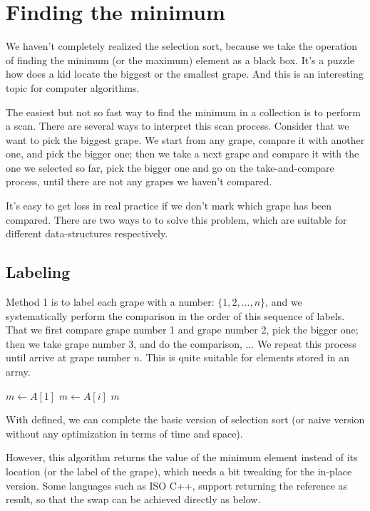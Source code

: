 \documentclass{article}
\begin{document}
\section{Finding the minimum}

We haven't completely realized the selection sort, because we take the operation
of finding the minimum (or the maximum) element as a black box. It's a puzzle how does
a kid locate the biggest or the smallest grape.
And this is an interesting topic for computer algorithms.

The easiest but not so fast way to find the minimum in a collection is to perform
a scan. There are several ways to interpret this scan process. Consider that
we want to pick the biggest grape. We start from any grape, compare it with
another one, and pick the bigger one; then we take a next grape and compare
it with the one we selected so far, pick the bigger one and go on the take-and-compare
process, until there are not any grapes we haven't compared.

It's easy to get loss in real practice if we don't mark which grape has been
compared. There are two ways to to solve this problem, which are suitable for
different data-structures respectively.

\subsection{Labeling}
Method 1 is to label each grape with a number: $\{1, 2, ..., n\}$, and we systematically
perform the comparison in the order of this sequence of labels. That we first
compare grape number 1 and grape number 2, pick the bigger one; then we take grape
number 3, and do the comparison, ... We repeat this process until arrive at
grape number $n$. This is quite suitable for elements stored in an array.

\begin{algorithmic}
  \State $m \gets A[1]$
      \State $m \gets A[i]$
    \EndIf
  \EndFor
  \State \Return $m$
\EndFunction
\end{algorithmic}

With  defined, we can complete the basic version of selection sort
(or naive version without any optimization in terms of time and space).

However, this algorithm returns the value of the minimum element instead of its
location (or the label of the grape), which needs a bit tweaking for the in-place version.
Some languages such as ISO C++, support returning the reference as result, so that the
swap can be achieved directly as below.
\end{document}
